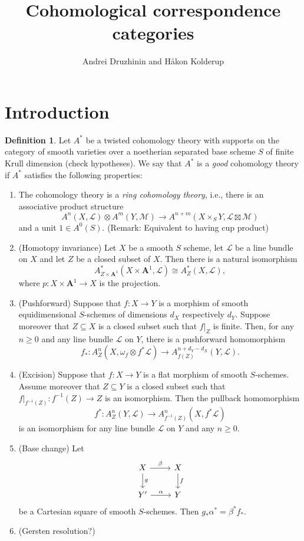 \documentclass[a4paper, oneside, english,reqno]{amsart}
\theoremstyle{plain}
\theoremstyle{definition}
\newtheorem{definition}[theorem]{Definition}
\theoremstyle{remark}
\newcommand{\A}{\mathbf{A}}
\newcommand{\scrL}{\mathscr{L}}
\newcommand{\scrM}{\mathscr{M}}
\begin{document}
\title{Cohomological correspondence categories}
\author{Andrei Druzhinin and Håkon Kolderup}
\maketitle


\section{Introduction}

\begin{definition}\label{def:coh}
Let $A^*$ be a twisted cohomology theory with supports on the category of smooth varieties over a noetherian separated base scheme $S$ of finite Krull dimension (check hypotheses). We say that $A^*$ is a \emph{good} cohomology theory if $A^*$ satisfies the following properties:
\begin{enumerate}
\item The cohomology theory is a \emph{ring cohomology theory}, i.e., there is an associative product structure
\[
A^n(X,\scrL)\otimes A^m(Y,\scrM)\to A^{n+m}(X\times_S Y,\scrL\boxtimes \scrM)
\]
and a unit $1\in A^0(S)$. (Remark: Equivalent to having cup product)
\item (Homotopy invariance) Let $X$ be a smooth $S$ scheme, let $\scrL$ be a line bundle on $X$ and let $Z$ be a closed subset of $X$. Then there is a natural isomorphism
\[
A^*_{Z\times\A^1}(X\times\A^1,\scrL)\cong A^*_Z(X,\scrL),
\]
where $p\colon X\times\A^1\to X$ is the projection.
\item (Pushforward) Suppose that $f\colon X\to Y$ is a morphism of smooth equidimensional $S$-schemes of dimensions $d_X$ respectively $d_Y$. Suppose moreover that $Z\subseteq X$ is a closed subset such that $f|_Z$ is finite. Then, for any $n\ge0$ and any line bundle $\scrL$ on $Y$, there is a pushforward homomorphism
\[
f_*\colon A^n_Z(X,\omega_f\otimes f^*\scrL)\to A^{n+d_Y-d_X}_{f(Z)}(Y,\scrL).
\]
\item (Excision) Suppose that $f\colon X\to Y$ is a flat morphism of smooth $S$-schemes. Assume moreover that $Z\subseteq Y$ is a closed subset such that $f|_{f^{-1}(Z)}\colon f^{-1}(Z)\to Z$ is an isomorphism. Then the pullback homomorphism
\[
f^*\colon A^n_Z(Y,\scrL)\to A^n_{f^{-1}(Z)}(X,f^*\scrL)
\]
is an isomorphism for any line bundle $\scrL$ on $Y$ and any $n\ge0$.
\item (Base change) Let
\[\begin{tikzcd}
X\ar{r}{\beta}\ar{d}{g} & X\ar{d}{f} \\
Y'\ar{r}{\alpha} & Y
\end{tikzcd}\]
be a Cartesian square of smooth $S$-schemes. Then $g_*\alpha^*=\beta^*f_*$.
\item (Gersten resolution?)

\end{enumerate}
\end{definition}
\end{document}
